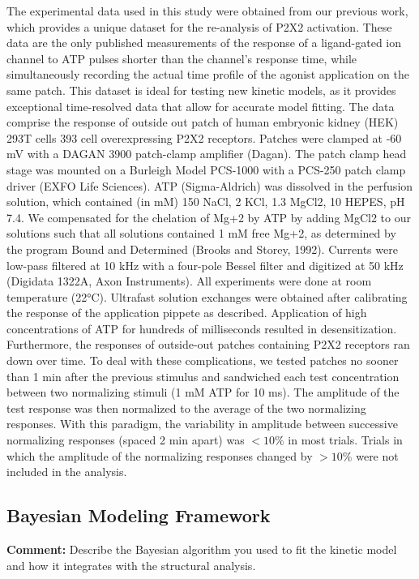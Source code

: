 \documentclass{article}
\begin{document}
	The experimental data used in this study were obtained from our previous work, which provides a unique dataset for the re-analysis of P2X2 activation. These data are the only published measurements of the response of a ligand-gated ion channel to ATP pulses shorter than the channel's response time, while simultaneously recording the actual time profile of the agonist application on the same patch. This dataset is ideal for testing new kinetic models, as it provides exceptional time-resolved data that allow for accurate model fitting. 
	The data comprise the response of outside out patch of human embryonic kidney (HEK) 293T cells 393 cell overexpressing P2X2 receptors. Patches were clamped at -60 mV with a DAGAN 3900 patch-clamp amplifier (Dagan). The patch clamp head stage was mounted on a Burleigh Model PCS-1000 with a PCS-250 patch clamp driver (EXFO Life Sciences). ATP (Sigma-Aldrich) was dissolved in the perfusion solution, which contained (in mM) 150 NaCl, 2 KCl, 1.3 MgCl2, 10 HEPES,	pH 7.4. We compensated for the chelation of Mg+2 by ATP by adding MgCl2 to our solutions such that all solutions contained 1 mM free Mg+2, as determined by the program Bound and Determined (Brooks and Storey, 1992). Currents were low-pass filtered at 10 kHz with a four-pole Bessel filter and digitized at 50 kHz (Digidata 1322A, Axon Instruments). All experiments were done at room temperature (22°C).
	Ultrafast solution exchanges were obtained after calibrating the response of the application pippete as described. 
	Application of high concentrations of ATP for hundreds of milliseconds resulted in desensitization. Furthermore, the responses of outside-out patches containing P2X2 receptors ran down over time. To deal with these complications, we tested patches no sooner than 1 min after the previous stimulus and sandwiched each test concentration between two normalizing stimuli (1 mM ATP for 10 ms). The amplitude of the test response was then normalized to the average of the two normalizing responses. With this paradigm, the variability in amplitude between successive normalizing responses (spaced 2 min apart) was $<10\% $ in most trials. Trials in which the amplitude of the normalizing responses changed by $>10\%$ were not included in the analysis.
	
	
	
	\subsection{Bayesian Modeling Framework}
	\textbf{Comment:} Describe the Bayesian algorithm you used to fit the kinetic model and how it integrates with the structural analysis.
	
\end{document}
